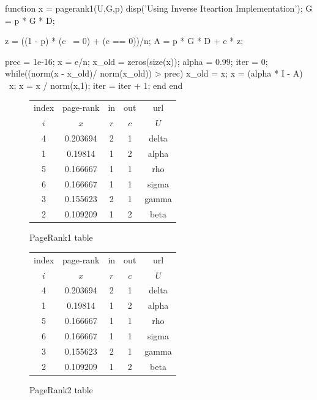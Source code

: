 \documentclass[unicode,11pt,a4paper,oneside,numbers=endperiod,openany]{scrartcl}
\begin{document}
\begin{mcode}
    function x = pagerank1(U,G,p)
    disp('Using Inverse Iteartion Implementation\n');
    G = p * G * D;

    z = ((1 - p) * (c ~= 0) + (c == 0))/n;
    A = p * G * D + e * z;

    prec = 1e-16;
    x = e/n;
    x_old = zeros(size(x));
    alpha = 0.99;
    iter = 0;
    while((norm(x - x_old)/ norm(x_old)) > prec)
        x_old = x;
        x = (alpha * I - A) \ x;
        x = x / norm(x,1);
        iter = iter + 1;
    end
    end
\end{mcode}

\begin{figure}[H]
    \centering
    \begin{minipage}{0.45\textwidth}
        \centering
        \begin{tabular}{|c|c|c|c|c|}
            \hline
            index & page-rank & in  & out & url   \\
            $i$   & $x$       & $r$ & $c$ & $U$   \\
            \hline
            4     & 0.203694  & 2   & 1   & delta \\
            1     & 0.19814   & 1   & 2   & alpha \\
            5     & 0.166667  & 1   & 1   & rho   \\
            6     & 0.166667  & 1   & 1   & sigma \\
            3     & 0.155623  & 2   & 1   & gamma \\
            2     & 0.109209  & 1   & 2   & beta  \\
            \hline
        \end{tabular}
        \caption{PageRank1 table}
    \end{minipage}%
    \hfill
    \begin{minipage}{0.45\textwidth}
        \centering
        \begin{tabular}{|c|c|c|c|c|}
            \hline
            index & page-rank & in  & out & url   \\
            $i$   & $x$       & $r$ & $c$ & $U$   \\
            \hline
            4     & 0.203694  & 2   & 1   & delta \\
            1     & 0.19814   & 1   & 2   & alpha \\
            5     & 0.166667  & 1   & 1   & rho   \\
            6     & 0.166667  & 1   & 1   & sigma \\
            3     & 0.155623  & 2   & 1   & gamma \\
            2     & 0.109209  & 1   & 2   & beta  \\
            \hline
        \end{tabular}
        \caption{PageRank2 table}
    \end{minipage}
\end{figure}
\end{document}
